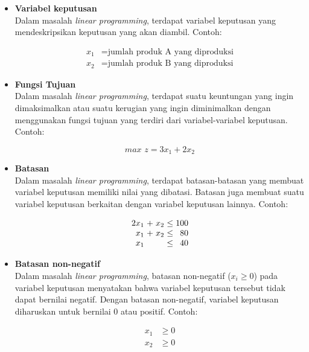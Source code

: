 \begin{itemize}
	\item \textbf{Variabel keputusan}\\
		Dalam masalah \textit{linear programming}, terdapat variabel keputusan yang mendeskripsikan keputusan yang akan diambil. Contoh:
		
		\begin{equation*}
			\begin{split}
				x_1 &= \text{jumlah produk A yang diproduksi} \\
    			x_2 &= \text{jumlah produk B yang diproduksi}
			\end{split}
		\end{equation*}
		
	\item \textbf{Fungsi Tujuan}\\
		Dalam masalah \textit{linear programming}, terdapat suatu keuntungan yang ingin dimaksimalkan atau suatu kerugian yang ingin diminimalkan dengan menggunakan  fungsi tujuan yang terdiri dari variabel-variabel keputusan. Contoh:
		
		\begin{equation*}
			\textit{max } z = 3x_1 + 2x_2
		\end{equation*}

	\item \textbf{Batasan}\\
		Dalam masalah \textit{linear programming}, terdapat batasan-batasan yang membuat variabel keputusan memiliki nilai yang dibatasi. Batasan juga membuat suatu variabel keputusan berkaitan dengan variabel keputusan lainnya. Contoh:
		
		\begin{equation*}		
			\setlength\arraycolsep{1.5pt}
			\begin{array}{r c r c r}
				2x_1 & + & x_2 & \leq & 100 \\
    			x_1 & + & x_2 & \leq & 80 \\
    			x_1 & & & \leq & 40
			\end{array}
		\end{equation*}
		
	\item \textbf{Batasan non-negatif}\\
		Dalam masalah \textit{linear programming}, batasan non-negatif (\(x_i\geq 0\)) pada variabel keputusan menyatakan bahwa variabel keputusan tersebut tidak dapat bernilai negatif. Dengan batasan non-negatif, variabel keputusan diharuskan untuk bernilai 0 atau positif. Contoh:
		
		\begin{equation*}
			\begin{split}
    			x_1 &\geq 0 \\
    			x_2 &\geq 0
			\end{split}
		\end{equation*}
		
\end{itemize}


